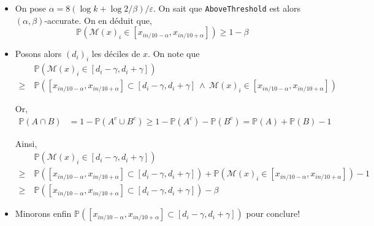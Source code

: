 \begin{itemize}[label=•]
    \item On pose \(\alpha = 8\left( \log k + \log 2/\beta \right)/\varepsilon\). On sait que \texttt{AboveThreshold} est alors \((\alpha, \beta)\)-accurate. On en déduit que, 
    \[
        \mathbb P \left( \mathcal M(x)_i \in [x_{i n/10 -\alpha},x_{i n/10 +\alpha}] \right) \geq 1 - \beta
    \]
    \item Posons alors \((d_i)_i\) les déciles de \(x\). On note que 
    \begin{align*}
         &\ \mathbb P\left(  \mathcal M(x)_i \in [d_i - \gamma, d_i + \gamma] \right) \\
        \geq &\ \mathbb P \left([x_{i n/10 -\alpha},x_{i n/10 +\alpha}] \subset [d_i - \gamma, d_i + \gamma]\ \wedge\  \mathcal M(x)_i \in [x_{i n/10 -\alpha},x_{i n/10 +\alpha}]  \right)
    \end{align*}

    Or, 
    \begin{align*}
        \mathbb{P}(A \cap B) & = 1 - \mathbb{P}(A^c \cup B^c) \geq 1 - \mathbb{P}(A^c) -  \mathbb{P}(B^c) = \mathbb{P}(A) + \mathbb{P}(B) - 1
    \end{align*}

    Ainsi, 
    \begin{align*}
        &\  \mathbb P\left(  \mathcal M(x)_i \in [d_i - \gamma, d_i + \gamma] \right) \\
       \geq &\ \mathbb P \left([x_{i n/10 -\alpha},x_{i n/10 +\alpha}] \subset [d_i - \gamma, d_i + \gamma] \right) + \mathbb P\left( \mathcal M(x)_i \in [x_{in/10 -\alpha},x_{i n/10 +\alpha}]  \right) - 1\\
       \geq &\ \mathbb P \left([x_{i n/10 -\alpha},x_{i n/10 +\alpha}] \subset [d_i - \gamma, d_i + \gamma] \right) - \beta
   \end{align*}
   \item Minorons enfin \(\mathbb P \left([x_{i n/10 -\alpha},x_{i n/10 +\alpha}] \subset [d_i - \gamma, d_i + \gamma] \right)\) pour conclure!\\
   


\end{itemize}
